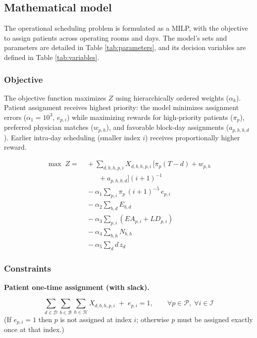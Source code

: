 

\subsection{Mathematical model}

The operational scheduling problem is formulated as a MILP, with the objective to assign patients across operating rooms and days. The model's sets and parameters are detailed in Table \ref{tab:parameters}, and its decision variables are defined in Table \ref{tab:variables}.

\subsubsection{Objective}
The objective function maximizes $Z$ using hierarchically ordered weights ($\alpha_k$). Patient assignment receives highest priority: the model minimizes assignment errors ($\alpha_1=10^3$, $e_{p,i}$) while maximizing rewards for high-priority patients ($\pi_p$), preferred physician matches ($w_{p,h}$), and favorable block-day assignments ($a_{p,h,b,d}$). Earlier intra-day scheduling (smaller index $i$) receives proportionally higher reward.


\begin{align}
\max \; Z
=&\; +\sum_{d,b,h,p,i}X_{d,b,h,p,i}\,\Big[ \pi_p (T-d) + w_{p,h} \nonumber \label{obj:priority-reward}\\
& \qquad + a_{p,h,b,d} \Big] (i+1)^{-1}\\
&\; - \alpha_1\sum_{p,i}\pi_p \,(i+1)^{-5} \, e_{p,i} \label{obj:error-patient} \\
&\; - \alpha_2\sum_{b,d}E_{b,d} \label{obj:error-bloc-day} \\
&\; - \alpha_3\sum_{p,i}\left( EA_{p,i} + LD_{p,i} \right) \label{obj:stay-violations} \\
&\; - \alpha_4\sum_{b,h}N_{b,h} \label{obj:specialty-fragmentation} \\
&\; - \alpha_5\sum_{d} d \, z_d \label{obj:day-usage}
\end{align}



\subsubsection{Constraints}
\textbf{Patient one-time assignment (with slack).}

\begin{equation}
\sum_{d\in\mathcal{D}} \sum_{b\in\mathcal{B}} \sum_{h\in\mathcal{H}}
   X_{d,b,h,p,i}
\;+\;
e_{p,i}
= 1,
\qquad
\forall p\in\mathcal{P},\; \forall i\in\mathcal{I}
\label{c:one-assignment}
\end{equation}
(If $e_{p,i}=1$ then $p$ is not assigned at index $i$; otherwise $p$ must be assigned exactly once at that index.)

